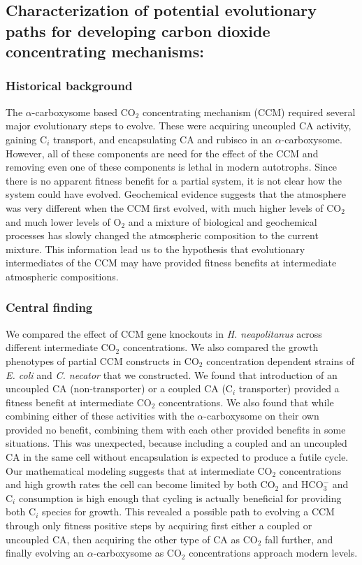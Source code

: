 \documentclass{article}
\begin{document}
\newrefsection
\subsection{Characterization of potential evolutionary paths for developing carbon dioxide concentrating mechanisms:} \label{CCM_evo}
\subsubsection{Historical background}
The $\alpha$-carboxysome based CO$_2$ concentrating mechanism (CCM) required several major evolutionary steps to evolve.
These were acquiring uncoupled CA activity, gaining C$_i$ transport, and encapsulating CA and rubisco in an $\alpha$-carboxysome.
However, all of these components are need for the effect of the CCM and removing even one of these components is lethal in modern autotrophs.
Since there is no apparent fitness benefit for a partial system, it is not clear how the system could have evolved.
Geochemical evidence suggests that the atmosphere was very different when the CCM first evolved, with much higher levels of CO$_2$ and much lower levels of O$_2$ and a mixture of biological and geochemical processes has slowly changed the atmospheric composition to the current mixture.
This information lead us to the hypothesis that evolutionary intermediates of the CCM may have provided fitness benefits at intermediate atmospheric compositions.
%
\subsubsection{Central finding}
We compared the effect of CCM gene knockouts in \textit{H. neapolitanus} across different intermediate CO$_2$ concentrations.
We also compared the growth phenotypes of partial CCM constructs in CO$_2$ concentration dependent strains of \textit{E. coli} and \textit{C. necator} that we constructed.
We found that introduction of an uncoupled CA (non-transporter) or a coupled CA (C$_i$ transporter) provided a fitness benefit at intermediate CO$_2$ concentrations.
We also found that while combining either of these activities with the $\alpha$-carboxysome on their own provided no benefit, combining them with each other provided benefits in some situations. 
This was unexpected, because including a coupled and an uncoupled CA in the same cell without encapsulation is expected to produce a futile cycle.
Our mathematical modeling suggests that at intermediate CO$_2$ concentrations and high growth rates the cell can become limited by both CO$_2$ and HCO$_{3}^{-}$ and C$_i$ consumption is high enough that cycling is actually beneficial for providing both C$_i$ species for growth.
This revealed a possible path to evolving a CCM through only fitness positive steps by acquiring first either a coupled or uncoupled CA, then acquiring the other type of CA as CO$_2$ fall further, and finally evolving an $\alpha$-carboxysome as CO$_2$ concentrations approach modern levels.
%
\end{document}
